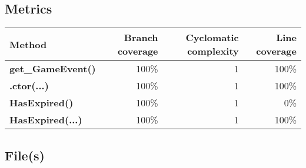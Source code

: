 \documentclass[a4paper,landscape,10pt]{article}
\begin{document}
\subsection{Metrics}
\begin{longtable}[l]{|l|r|r|r|}
\hline
\textbf{Method} & \textbf{Branch coverage} & \textbf{Cyclomatic complexity} & \textbf{Line coverage}\\
\hline
\textbf{get\_GameEvent()} & 100\% & 1 & 100\%\\
\hline
\textbf{.ctor(...)} & 100\% & 1 & 100\%\\
\hline
\textbf{HasExpired()} & 100\% & 1 & 0\%\\
\hline
\textbf{HasExpired(...)} & 100\% & 1 & 100\%\\
\hline
\end{longtable}
\subsection{File(s)}
\end{document}
